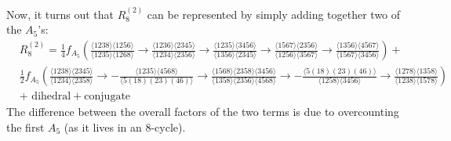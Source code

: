 \documentclass[12pt]{article}
\begin{document}
Now, it turns out that $R^{(2)}_8$ can be represented by simply adding together two of the $A_5$'s:
{\small \begin{equation}\label{eq:r28A5}
\begin{split}
	&R^{(2)}_8 = \frac14 f_{A_5}\left(\frac{\langle 1238\rangle  \langle 1256\rangle }{\langle
   1235\rangle  \langle 1268\rangle }\to \frac{\langle
   1236\rangle  \langle 2345\rangle }{\langle 1234\rangle
    \langle 2356\rangle }\to \frac{\langle 1235\rangle 
   \langle 3456\rangle }{\langle 1356\rangle  \langle
   2345\rangle }\to \frac{\langle 1567\rangle  \langle
   2356\rangle }{\langle 1256\rangle  \langle 3567\rangle
   }\to \frac{\langle 1356\rangle  \langle 4567\rangle
   }{\langle 1567\rangle  \langle 3456\rangle }\right)+\\
   &\frac12 f_{A_5}\left(\frac{\langle 1238\rangle  \langle 2345\rangle
   }{\langle 1234\rangle  \langle 2358\rangle
   }\to-\frac{\langle 1235\rangle  \langle 4568\rangle
   }{\langle 5(18)(23)(46)\rangle }\to\frac{\langle
   1568\rangle  \langle 2358\rangle  \langle 3456\rangle
   }{\langle 1358\rangle  \langle 2356\rangle  \langle
   4568\rangle }\to-\frac{\langle 5(18)(23)(46)\rangle
   }{\langle 1258\rangle  \langle 3456\rangle
   }\to\frac{\langle 1278\rangle  \langle 1358\rangle
   }{\langle 1238\rangle  \langle 1578\rangle }\right)\\
   &+\text{ dihedral} + \text{conjugate}
\end{split}
\end{equation}}
The difference between the overall factors of the two terms is due to overcounting the first $A_5$ (as it lives in an 8-cycle).
\end{document}
